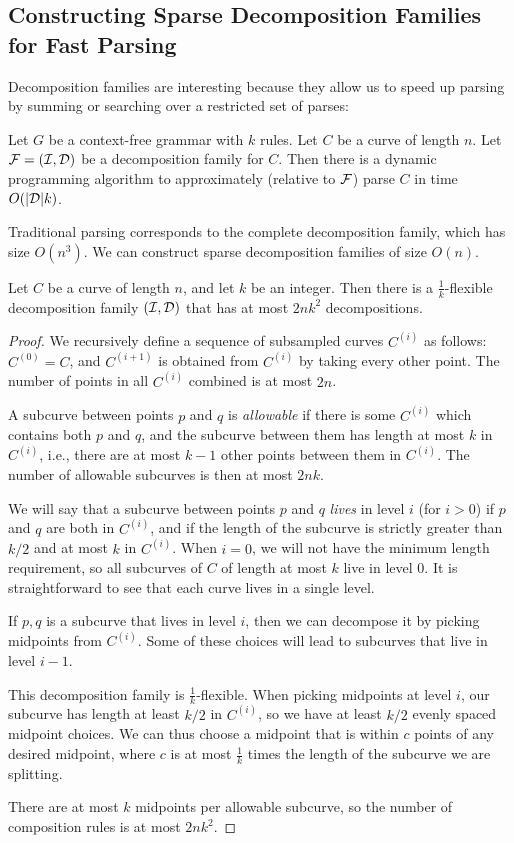 \subsection{Constructing Sparse Decomposition Families for Fast Parsing}

Decomposition families are interesting because they allow us to speed
up parsing by summing or searching over a restricted set of parses:
\begin{thm}
  Let $G$ be a context-free grammar with $k$ rules. Let $C$ be a
  curve of length $n$. Let ${\mathcal F}=({\mathcal I},{\mathcal D})$ be a decomposition
  family for $C$. Then there is a dynamic programming algorithm to
  approximately (relative to ${\mathcal F}$) parse $C$ in time $O(|{\mathcal D}|k)$.
\end{thm}
Traditional parsing corresponds to the complete decomposition family,
which has size $O(n^3)$. We can construct sparse decomposition
families of size $O(n)$.

\begin{thm}
  Let $C$ be a curve of length $n$, and let $k$ be an integer. Then
  there is a $\frac{1}{k}$-flexible decomposition family $({\mathcal I},{\mathcal D})$
  that has at most $2nk^2$ decompositions.
\end{thm}

\begin{proof}
  We recursively define a sequence of subsampled curves $C^{(i)}$ as
  follows: $C^{(0)} = C$, and $C^{(i+1)}$ is obtained from $C^{(i)}$
  by taking every other point. The number of points in all $C^{(i)}$
  combined is at most $2n$.

  A subcurve between points $p$ and $q$ is \emph{allowable} if there
  is some $C^{(i)}$ which contains both $p$ and $q$, and the subcurve
  between them has length at most $k$ in $C^{(i)}$, i.e., there are at
  most $k-1$ other points between them in $C^{(i)}$. The number of
  allowable subcurves is then at most $2nk$.

  We will say that a subcurve between points $p$ and $q$ \emph{lives}
  in level $i$ (for $i>0$) if $p$ and $q$ are both in $C^{(i)}$, and
  if the length of the subcurve is strictly greater than $k/2$ and at
  most $k$ in $C^{(i)}$. When $i=0$, we will not have the minimum
  length requirement, so all subcurves of $C$ of length at most $k$
  live in level $0$. It is straightforward to see that each curve
  lives in a single level.

  If $p,q$ is a subcurve that lives in level $i$, then we can
  decompose it by picking midpoints from $C^{(i)}$. Some of these
  choices will lead to subcurves that live in level $i-1$.

  This decomposition family is $\frac{1}{k}$-flexible. When picking
  midpoints at level $i$, our subcurve has length at least $k/2$ in
  $C^{(i)}$, so we have at least $k/2$ evenly spaced midpoint
  choices. We can thus choose a midpoint that is within $c$ points of
  any desired midpoint, where $c$ is at most $\frac{1}{k}$ times the
  length of the subcurve we are splitting.
  
  There are at most $k$ midpoints per allowable subcurve, so the number
  of composition rules is at most $2nk^2$.
\end{proof}


